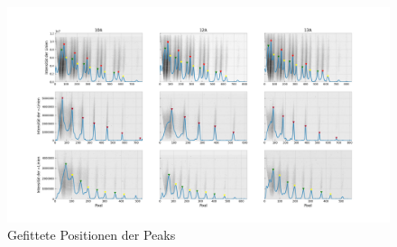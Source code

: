         \begin{landscape}
          \thispagestyle{empty}
          \begin{figure}
            \vspace*{-2cm}
            \caption{Gefittete Positionen der Peaks}
            \label{plot::2}
            \hspace*{-6cm}\includegraphics[width=1.5\paperwidth]{Auswertung/peaks}
          \end{figure}
        \end{landscape}
